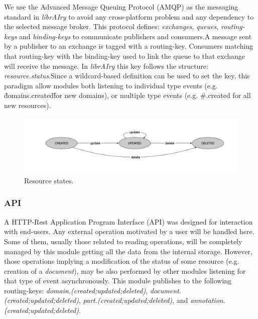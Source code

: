 We use the Advanced Message Queuing Protocol (AMQP) as the messaging standard in \textit{librAIry} to avoid any cross-platform problem and any dependency to the selected message broker. This protocol defines: \textit{exchanges}, \textit{queues}, \textit{routing-keys} and \textit{binding-keys} to communicate publishers and consumers.A message sent by a publisher to an exchange is tagged with a routing-key. Consumers matching that routing-key with the binding-key used to link the queue to that exchange will receive the message. In \textit{librAIry} this key follows the structure: \textit{resource.status}.Since a wildcard-based definition can be used to set the key, this paradigm allow modules both listening to individual type events (e.g. \'domains.created\' for new domains), or multiple type events (e.g. \#.created for all new resources).

\begin{figure}
  \includegraphics[scale=0.3]{resource-states}
  \caption{Resource states.}
  \label{fig:librairy-states}
\end{figure}


\subsubsection{API}

A HTTP-Rest Application Program Interface (API) was designed for interaction with end-users. Any external operation motivated by a user will be handled here. Some of them, usually those related to reading operations, will be completely managed by this module getting all the data from the internal storage. However, those operations implying a modification of the status of some resource (e.g. creation of a \textit{document}), may be also performed by other modules listening for that type of event asynchronously. This module publishes to the following routing-keys: \textit{domain.(created;updated;deleted)}, \textit{document.(created;updated;deleted)}, \textit{part.(created;updated;deleted)}, and \textit{annotation.(created;updated;deleted)}.

